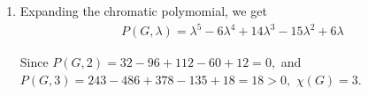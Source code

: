 \documentclass[12pt]{article}
\begin{document}
\begin{enumerate}
\begin{enumerate}
    \item Expanding the chromatic polymomial, we get
      \begin{align*}
        P(G, \lambda) = \lambda^5 - 6\lambda^4 + 14\lambda^3 - 15
        \lambda^2 + 6\lambda
      \end{align*}

      Since $P(G, 2) = 32 - 96 + 112 - 60 + 12 = 0,$ and $P(G, 3) =
      243 - 486 + 378 - 135 + 18 = 18 > 0,$ $\chi(G) = 3.$
  \end{enumerate}
\end{enumerate}
\end{document}
